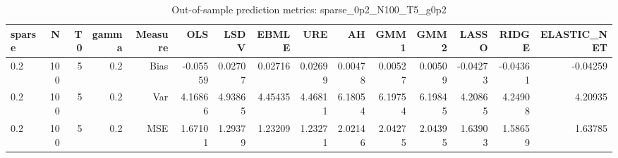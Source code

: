 \begin{table}[!htbp]\centering
\caption{Out-of-sample prediction metrics: sparse_0p2_N100_T5_g0p2}
\label{tab:table3_sparse_0p2_N100_T5_g0p2}
\begin{tabular}{lrrrrrrrrrrrrrr}
\hline
sparse & N & T0 & gamma & Measure & OLS & LSDV & EBMLE & URE & AH & GMM1 & GMM2 & LASSO & RIDGE & ELASTIC_NET \\
\hline
0.2 & 100 & 5 & 0.2 & Bias & -0.05559 & 0.02707 & 0.02716 & 0.02699 & 0.00478 & 0.00527 & 0.00509 & -0.04273 & -0.04361 & -0.04259 \\
0.2 & 100 & 5 & 0.2 & Var & 4.16866 & 4.93865 & 4.45435 & 4.46811 & 6.18054 & 6.19754 & 6.19845 & 4.20865 & 4.24908 & 4.20935 \\
0.2 & 100 & 5 & 0.2 & MSE & 1.67101 & 1.29379 & 1.23209 & 1.23271 & 2.02146 & 2.04275 & 2.04395 & 1.63903 & 1.58659 & 1.63785 \\
\hline
\end{tabular}
\end{table}

